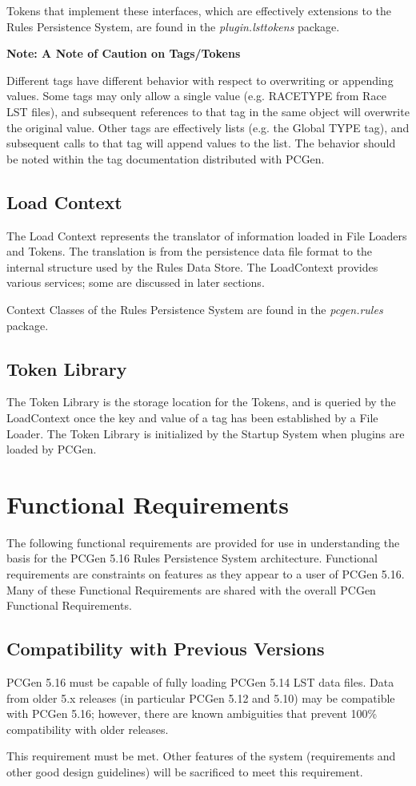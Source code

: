 \documentclass[12pt,letterpaper]{article}
\newcommand{\pcgenversEOS}{5.16}
\newcommand{\systemEOS}{Rules Persistence System}
\newcommand{\system}{\systemEOS{} }
\newcommand{\pcgenvers}{\pcgenversEOS{} }
\newcommand{\textem}[1]{\emph{#1}}
\newcommand{\nsection}[1]{\newpage \section{#1}}
\newcommand{\lnsection}[1]{\label{#1}\nsection{#1}}
\newcommand{\lsubsection}[1]{\label{#1}\subsection{#1}}
\newcommand{\sidebar}[5]{
\noindent
\definecolor{shadecolor}{#2}{#3}
\begin{minipage}{\textwidth}
\setlength{\parskip}{-11pt}
\begin{shaded}\textbf{#1: #4}\end{shaded}
\begin{boxedminipage}{\textwidth}
#5
\end{boxedminipage}
\end{minipage}
}
\newcommand{\sbnote}[2]{\sidebar{Note}{gray}{0.9}{#1}{#2}}
\begin{document}
Tokens that implement these interfaces, which are effectively extensions to the \systemEOS,
are found in the \textem{plugin.lsttokens} package.

\sbnote{A Note of Caution on Tags/Tokens}{Different tags have different behavior with respect to 
overwriting or appending values.  Some tags may only allow a single value (e.g. RACETYPE
from Race LST files), and subsequent references to that tag in the same object
will overwrite the original value. Other tags are effectively lists
(e.g. the Global TYPE tag), and subsequent calls to that tag
will append values to the list.  The behavior should be noted within the tag documentation
distributed with PCGen.}

\lsubsection{Load Context}

The Load Context represents the translator of information loaded in
File Loaders and Tokens.  The translation is from the persistence data file format 
to the internal structure used by the Rules Data Store.  The LoadContext provides
various services; some are discussed in later sections.

Context Classes of the \system are found in the \textem{pcgen.rules} package.

\lsubsection{Token Library}

The Token Library is the storage location for the Tokens, and is queried by the LoadContext
once the key and value of a tag has been established by a File Loader.  The Token Library is
initialized by the Startup System when plugins are loaded by PCGen.

\lnsection{Functional Requirements}

The following functional requirements are provided for use in understanding the basis for the PCGen \pcgenvers
\system architecture. Functional requirements are constraints on features as they appear to a user
of PCGen \pcgenversEOS.  Many of these Functional Requirements are shared with the overall PCGen 
Functional Requirements.

\lsubsection{Compatibility with Previous Versions}

PCGen \pcgenvers must be capable of fully loading PCGen 5.14 LST data files.  Data from older 5.x releases
(in particular PCGen 5.12 and 5.10) may be compatible with PCGen \pcgenversEOS; however, there are known
ambiguities that prevent 100\% compatibility with older releases.  

This requirement must be met.  Other features of the system (requirements and other good design guidelines)
will be sacrificed to meet this requirement.
\end{document}
